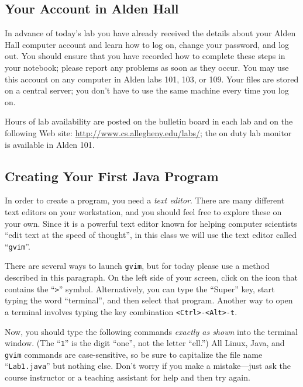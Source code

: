 \vspace*{-.3in}
\subsection*{Your Account in Alden Hall}

In advance of today's lab you have already received the details about your Alden Hall computer account and learn how to
log on, change your password, and log out.  You should ensure that you have recorded how to complete these steps in your
notebook; please report any problems as soon as they occur. You may use this account on any computer in Alden labs 101,
103, or 109. Your files are stored on a central server; you don't have to use the same machine every time you log on.

Hours of lab availability are posted on the bulletin board in each lab and on the following Web site:
\url{http://www.cs.allegheny.edu/labs/}; the on duty lab monitor is available in Alden 101.

\vspace*{-.1in}
\subsection*{Creating Your First Java Program}

In order to create a program, you need a {\em text editor}. There are many different text editors on your workstation, and
you should feel free to explore these on your own. Since it is a powerful text editor known for helping computer
scientists ``edit text at the speed of thought'', in this class we will use the text editor called ``{\tt gvim}''.


There are several ways to launch {\tt gvim}, but for today please use a method described in this paragraph.  On the
left side of your screen, click on the icon that contains the ``{\tt >}'' symbol.  Alternatively, you can type the
``Super'' key, start typing the word ``terminal'', and then select that program.  Another way to open a terminal
involves typing the key combination {\tt <Ctrl>-<Alt>-t}.


Now, you should type the following commands {\em exactly as shown} into the terminal window.  (The ``{\tt 1}'' is the digit ``one'', not
  the letter ``ell.'') All Linux, Java, and {\tt gvim} commands are case-sensitive, so be sure to capitalize the file
name ``{\tt Lab1.java}'' but nothing else.  Don't worry if you make a mistake---just ask the course instructor or a
teaching assistant for help and then try again.

